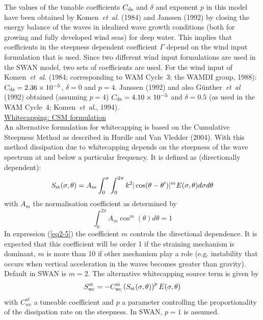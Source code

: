 \documentclass[12pt]{book}
\begin{document}
The values of the tunable coefficients $C_{\rm ds}$ and $\delta$ and exponent $p$ in this model have been obtained by
Komen~{\it et~al}. (1984) and Janssen (1992) by closing the energy balance of the waves in idealized wave growth conditions
(both for growing and fully developed wind seas) for deep water. This implies that coefficients in the steepness dependent
coefficient $\Gamma$ depend on the wind input formulation that is used. Since two different wind input formulations are
used in the SWAN model, two sets of coefficients are used. For the wind input of Komen~{\it et~al}. (1984; corresponding to WAM
Cycle~3; the WAMDI group, 1988): $C_{\rm ds} = 2.36 \times 10^{-5}$, $\delta=0$ and $p=4$. Janssen (1992) and also
G\"{u}nther~{\it et~al} (1992) obtained (assuming $p=4$) $C_{\rm ds} = 4.10 \times 10^{-5}$ and $\delta=0.5$ (as used in the WAM
Cycle~4; Komen~{\it et~al}., 1994).
\\[2ex]
\noindent
\underline{Whitecapping: CSM formulation}\\[2ex]
An alternative formulation for whitecapping is based on the Cumulative Steepness Method as described
in Hurdle and Van Vledder (2004). With this method dissipation due to whitecapping depends on the steepness of
the wave spectrum at and below a particular frequency. It is defined as (directionally dependent):
\begin{equation}
  S_{\rm st} (\sigma,\theta) = A_m \int_{0}^{\sigma} \int_{0}^{2\pi} k^2 | \cos (\theta - \theta')|^m E
  (\sigma,\theta)d\sigma d\theta
  \label{eq2-5}
\end{equation}
with $A_m$ the normalisation coefficient as determined by
\begin{equation}
  \int_{0}^{2\pi} A_m \cos^m (\theta) d\theta = 1
\end{equation}
In expression (\ref{eq2-5}) the coefficient $m$ controls the directional dependence. It is expected that this
coefficient will be order 1 if the straining mechanism is dominant, $m$ is more than 10 if other mechanism play
a role (e.g. instability that occurs when vertical acceleration in the waves becomes greater than gravity).
Default in SWAN is $m=2$. The alternative whitecapping source term is given by
\begin{equation}
  S_{\rm wc}^{\rm st} = -C_{\rm wc}^{\rm st} \left( S_{\rm st} (\sigma,\theta) \right)^p E (\sigma,\theta)
  \label{eq2-6}
\end{equation}
with $C_{wc}^{st}$ a tuneable coefficient and $p$ a parameter controlling the proportionality of the dissipation
rate on the steepness. In SWAN, $p=1$ is assumed.
\end{document}
